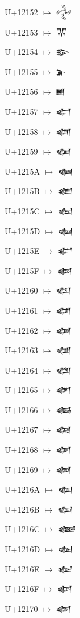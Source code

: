 {\noindent U+12152  $\mapsto$ {\cufont 𒅒}\par
\noindent U+12153  $\mapsto$ {\cufont 𒅓}\par
\noindent U+12154  $\mapsto$ {\cufont 𒅔}\par
\noindent U+12155  $\mapsto$ {\cufont 𒅕}\par
\noindent U+12156  $\mapsto$ {\cufont 𒅖}\par
\noindent U+12157  $\mapsto$ {\cufont 𒅗}\par
\noindent U+12158  $\mapsto$ {\cufont 𒅘}\par
\noindent U+12159  $\mapsto$ {\cufont 𒅙}\par
\noindent U+1215A  $\mapsto$ {\cufont 𒅚}\par
\noindent U+1215B  $\mapsto$ {\cufont 𒅛}\par
\noindent U+1215C  $\mapsto$ {\cufont 𒅜}\par
\noindent U+1215D  $\mapsto$ {\cufont 𒅝}\par
\noindent U+1215E  $\mapsto$ {\cufont 𒅞}\par
\noindent U+1215F  $\mapsto$ {\cufont 𒅟}\par
\noindent U+12160  $\mapsto$ {\cufont 𒅠}\par
\noindent U+12161  $\mapsto$ {\cufont 𒅡}\par
\noindent U+12162  $\mapsto$ {\cufont 𒅢}\par
\noindent U+12163  $\mapsto$ {\cufont 𒅣}\par
\noindent U+12164  $\mapsto$ {\cufont 𒅤}\par
\noindent U+12165  $\mapsto$ {\cufont 𒅥}\par
\noindent U+12166  $\mapsto$ {\cufont 𒅦}\par
\noindent U+12167  $\mapsto$ {\cufont 𒅧}\par
\noindent U+12168  $\mapsto$ {\cufont 𒅨}\par
\noindent U+12169  $\mapsto$ {\cufont 𒅩}\par
\noindent U+1216A  $\mapsto$ {\cufont 𒅪}\par
\noindent U+1216B  $\mapsto$ {\cufont 𒅫}\par
\noindent U+1216C  $\mapsto$ {\cufont 𒅬}\par
\noindent U+1216D  $\mapsto$ {\cufont 𒅭}\par
\noindent U+1216E  $\mapsto$ {\cufont 𒅮}\par
\noindent U+1216F  $\mapsto$ {\cufont 𒅯}\par
\noindent U+12170  $\mapsto$ {\cufont 𒅰}\par
}
